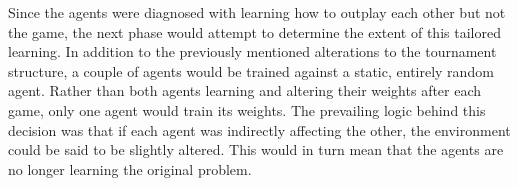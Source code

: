 Since the agents were diagnosed with learning how to outplay each other
but not the game,
the next phase would attempt to determine the extent of this tailored learning.
%
In addition to the previously mentioned alterations to the tournament structure,
a couple of agents would be trained against a static, entirely random agent.
%
Rather than both agents learning and altering their weights after each game,
only one agent would train its weights.
%
The prevailing logic behind this decision was that if each agent was indirectly
affecting the other,
the environment could be said to be slightly altered.
%
This would in turn mean that the agents are no longer learning the original
problem.


